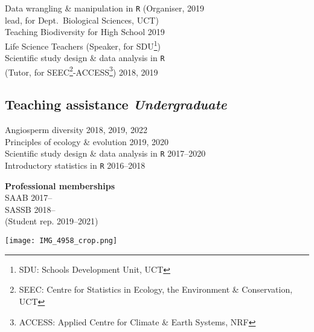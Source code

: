 \documentclass[10pt]{article}
\begin{document}
\begin{multicols}{2}
Data wrangling \& manipulation in \texttt{R}
  {\small (Organiser,}                             \hfill {\small       2019} \\
  \hspace{2em} {\small lead, for Dept.~Biological
    Sciences, UCT)}                                                           \\
Teaching Biodiversity for High School              \hfill {\small       2019} \\
  \hspace{2em} Life Science Teachers {\small
    (Speaker, for SDU\footnote{SDU: Schools Development
    Unit, UCT})}                                                              \\
Scientific study design \& data analysis in \texttt{R}                        \\
  \hspace{2em} {\small(Tutor, for SEEC\footnote{
    SEEC: Centre for Statistics in Ecology, the
    Environment \& Conservation, UCT}-ACCESS\footnote{
      ACCESS: Applied Centre for Climate \& Earth Systems,
      NRF})}                                       \hfill {\small 2018, 2019} \\

\subsection*{Teaching assistance %
                                \hfill {\small \textmd{\textit{Undergraduate}}}}

Angiosperm diversity                         \hfill {\small 2018, 2019, 2022} \\
Principles of ecology \& evolution           \hfill {\small       2019, 2020} \\
Scientific study design \& data analysis in \texttt{R}
                                             \hfill {\small       2017--2020} \\
Introductory statistics in \texttt{R}        \hfill {\small       2016--2018} \\

\begin{multicols}{2}
  \textbf{Professional memberships} \\ %
  SAAB                                  \hfill {\small 2017--\hspace*{2.5em}} \\
  SASSB                                 \hfill {\small 2018--\hspace*{2.5em}} \\
  \hspace{1em} (Student rep.            \hfill {\small 2019--2021})           \\
  \columnbreak
  \begin{center}
    \texttt{[image: IMG\_4958\_crop.png]}
  \end{center}
\end{multicols}


\end{multicols}
\end{document}

